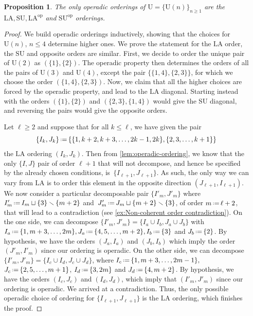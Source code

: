 \documentclass{amsart}
\newtheorem{proposition}[theorem]{Proposition}
\theoremstyle{definition}
\newcommand{\Un}{\mathrm{U}} %
\newcommand{\ssm}{\smallsetminus} %
\newcommand{\eqdef}{\mbox{\,\raisebox{0.2ex}{\scriptsize\ensuremath{\mathrm:}}\ensuremath{=}\,}} %
\newcommand{\SU}{\mathrm{SU}}
\newcommand{\LA}{\mathrm{LA}}
\newcommand{\op}{\mathrm{op}}
\begin{document}
\begin{proposition}
\label{prop:operadicOrdering}
The only operadic orderings of $\Un=\{\Un(n)\}_{n\geq 1}$ are the $\LA,\SU,\LA^{\op}$ and $\SU^{\op}$ orderings.
\end{proposition}

\begin{proof}
We build operadic orderings inductively, showing that the choices for $\Un(n)$, $n\leq 4$ determine higher ones. 
We prove the statement for the $\LA$ order, the $\SU$ and opposite orders are similar. 
First, we decide to order the unique pair of $\Un(2)$ as $(\{1\},\{2\})$.
The operadic property then determines the orders of all the pairs of $\Un(3)$ and $\Un(4)$, except the pair $\{\{1,4\},\{2,3\}\}$, for which we choose the order $(\{1,4\},\{2,3\})$.
Now, we claim that all the higher choices are forced by the operadic property, and lead to the $\LA$ diagonal. 
Starting instead with the orders $(\{1\},\{2\})$ and $(\{2,3\},\{1,4\})$ would give the $\SU$ diagonal, and reversing the pairs would give the opposite orders. 

Let $\ell \geq 2$ and suppose that for all $k\leq \ell$, we have given the pair \[\{I_k,J_k\} \eqdef \{\{1,k+2,{k+3},\dots,{2k-1},2k\},\{2,3,\dots,k+1\}\}\] the $\LA$ ordering $(I_k,J_k)$.
Then from \cref{lem:operadic-ordering}, we know that the only $\{I,J\}$ pair of order $\ell+1$ that will not decompose, and hence be specified by the already chosen conditions, is~$\{I_{\ell+1},J_{\ell+1}\}$.
As such, the only way we can vary from $\LA$ is to order this element in the opposite direction $(J_{\ell+1},I_{\ell+1})$. 
We now consider a particular decomposable pair $\{I'_m,J'_m\}$ where ${I'_m \eqdef I_m \sqcup \{3\} \ssm \{m+2\}}$ and~$J'_m \eqdef J_m \sqcup \{m+2\} \ssm \{3\}$, of order $m \eqdef \ell+2$, that will lead to a contradiction (see \cref{ex:Non-coherent order contradiction}).
On the one side, we can decompose $\{I'_m,J'_m\} = \{I_a \cup I_b, J_a \cup J_b\}$ with $I_a \eqdef  \{1,m+3,\dots,2m\}, J_a \eqdef  \{4,5,\dots,m+2\}, I_b \eqdef \{3\}$ and $J_b \eqdef  \{2\}$. 
By hypothesis, we have the orders $(J_a,I_a)$ and $(J_b,I_b)$ which imply the order $(J'_m,I'_m)$ since our ordering is operadic. 
On the other side, we can decompose $\{I'_m,J'_m\} = \{I_c \cup I_d, J_c \cup J_d\}$, where $I_c \eqdef  \{1,m+3,\dots,  2m-1\},$ $J_c \eqdef \{2,5,\dots,m+1\}$, $I_d \eqdef \{3, 2m\}$ and $J_d \eqdef  \{4, m+2\}$.
By hypothesis, we have the orders $(I_c,J_c)$ and $(I_d,J_d)$, which imply that $(I'_m,J'_m)$ since our ordering is operadic.
We arrived at a contradiction.
Thus, the only possible operadic choice of ordering for $\{I_{\ell+1},J_{\ell+1}\}$ is the $\LA$ ordering, which finishes the proof. 
\end{proof}
\end{document}
